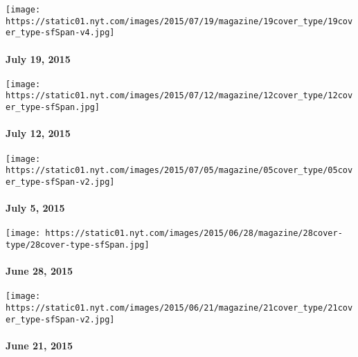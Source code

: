 \href{http://www.nytimes.com/indexes/2015/07/19/magazine/index.html}{}

\texttt{[image: https://static01.nyt.com/images/2015/07/19/magazine/19cover\_type/19cover\_type-sfSpan-v4.jpg]}

\hypertarget{july-19-2015}{%
\paragraph{July 19, 2015}\label{july-19-2015}}

\href{http://www.nytimes.com/indexes/2015/07/12/magazine/index.html}{}

\texttt{[image: https://static01.nyt.com/images/2015/07/12/magazine/12cover\_type/12cover\_type-sfSpan.jpg]}

\hypertarget{july-12-2015}{%
\paragraph{July 12, 2015}\label{july-12-2015}}

\href{http://www.nytimes.com/indexes/2015/07/05/magazine/index.html}{}

\texttt{[image: https://static01.nyt.com/images/2015/07/05/magazine/05cover\_type/05cover\_type-sfSpan-v2.jpg]}

\hypertarget{july-5-2015}{%
\paragraph{July 5, 2015}\label{july-5-2015}}

\href{http://www.nytimes.com/indexes/2015/06/28/magazine/index.html}{}

\texttt{[image: https://static01.nyt.com/images/2015/06/28/magazine/28cover-type/28cover-type-sfSpan.jpg]}

\hypertarget{june-28-2015}{%
\paragraph{June 28, 2015}\label{june-28-2015}}

\href{http://www.nytimes.com/indexes/2015/06/21/magazine/index.html}{}

\texttt{[image: https://static01.nyt.com/images/2015/06/21/magazine/21cover\_type/21cover\_type-sfSpan-v2.jpg]}

\hypertarget{june-21-2015}{%
\paragraph{June 21, 2015}\label{june-21-2015}}

